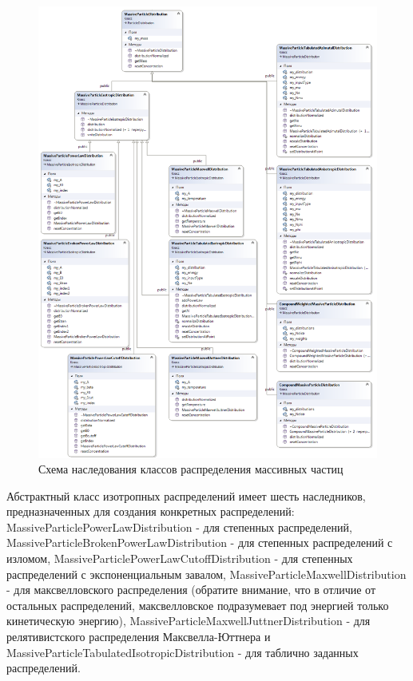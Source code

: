 \begin{figure}
	\centering
	\includegraphics[width=14.5 cm]{./fig/massiveParticleDistribution1.png} 
	\caption{Схема наследования классов распределения массивных частиц}
	\label{massiveDistribution}
\end{figure}

Абстрактный класс изотропных распределений имеет шесть наследников, предназначенных для создания конкретных распределений: MassiveParticlePowerLawDistribution - для степенных распределений, MassiveParticleBrokenPowerLawDistribution - для степенных распределений с изломом, MassiveParticlePowerLawCutoffDistribution - для степенных распределений с экспоненциальным завалом, MassiveParticleMaxwellDistribution - для максвелловского распределения (обратите внимание, что в отличие от остальных распределений, максвелловское подразумевает под энергией только кинетическую энергию), MassiveParticleMaxwellJuttnerDistribution - для релятивистского распределения Максвелла-Юттнера и MassiveParticleTabulatedIsotropicDistribution - для таблично заданных распределений. 

